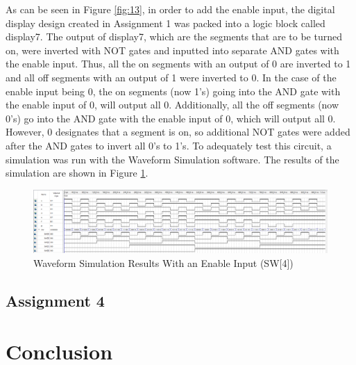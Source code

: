 \documentclass[
	letterpaper, %
	10pt, %
]{CSUniSchoolLabReport}
\begin{document}
\hspace{.5 in} As can be seen in Figure \ref{fig:13}, in order to add the enable input, the digital display design created in Assignment 1 was packed into a logic block called display7. The output of display7, which are the segments that are to be turned on, were inverted with NOT gates and inputted into separate AND gates with the enable input. Thus, all the on segments with an output of 0 are inverted to 1 and all off segments with an output of 1 were inverted to 0. In the case of the enable input being 0, the on segments (now 1’s) going into the AND gate with the enable input of 0, will output all 0. Additionally, all the off segments (now 0’s) go into the AND gate with the enable input of 0, which will output all 0. However, 0 designates that a segment is on, so additional NOT gates were added after the AND gates to invert all 0’s to 1’s. To adequately test this circuit, a simulation was run with the Waveform Simulation software. The results of the simulation are shown in Figure \ref{fig:14}.

\begin{figure}[H]
  \centering
  \includegraphics[width=.9\textwidth]{Figures/Sim_en.png}
  \caption{Waveform Simulation Results With an Enable Input (SW[4])}
  \label{fig:14}
\end{figure}

\subsection{Assignment 4}

\section{Conclusion}

\hspace{.5 in} 
\end{document}
